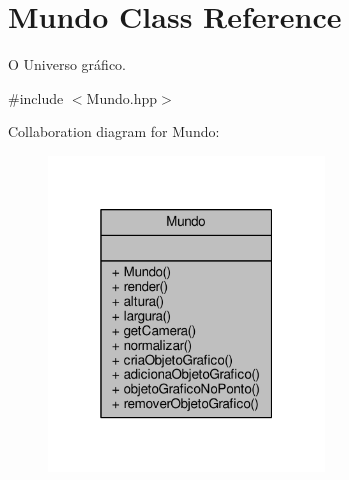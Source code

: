 \hypertarget{classMundo}{\section{Mundo Class Reference}
\label{classMundo}
}


O Universo gráfico.  




{\ttfamily \#include $<$Mundo.\+hpp$>$}



Collaboration diagram for Mundo\+:
\nopagebreak
\begin{figure}[H]
\begin{center}
\leavevmode
\includegraphics[width=208pt]{classMundo__coll__graph}
\end{center}
\end{figure}
